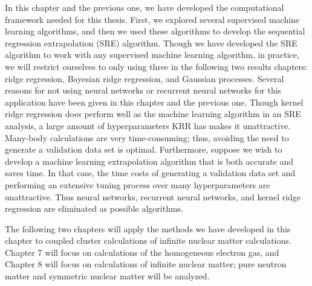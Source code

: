 In this chapter and the previous one, we have developed the computational framework needed for this thesis. First, we explored several supervised machine learning algorithms, and then we used these algorithms to develop the sequential regression extrapolation (SRE) algorithm. Though we have developed the SRE algorithm to work with any supervised machine learning algorithm, in practice, we will restrict ourselves to only using three in the following two results chapters: ridge regression, Bayesian ridge regression, and Gaussian processes. Several reasons for not using neural networks or recurrent neural networks for this application have been given in this chapter and the previous one. Though kernel ridge regression does perform well as the machine learning algorithm in an SRE analysis, a large amount of hyperparameters KRR has makes it unattractive. Many-body calculations are very time-consuming; thus, avoiding the need to generate a validation data set is optimal.
Furthermore, suppose we wish to develop a machine learning extrapolation algorithm that is both accurate and saves time. In that case, the time costs of generating a validation data set and performing an extensive tuning process over many hyperparameters are unattractive. Thus neural networks, recurrent neural networks, and kernel ridge regression are eliminated as possible algorithms.

The following two chapters will apply the methods we have developed in this chapter to coupled cluster calculations of infinite nuclear matter calculations. Chapter 7 will focus on calculations of the homogeneous electron gas, and Chapter 8 will focus on calculations of infinite nuclear matter; pure neutron matter and symmetric nuclear matter will be analyzed.